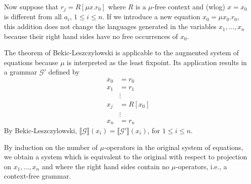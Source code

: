 \documentclass[11pt]{article}
\newcommand\Sem[1]{\llbracket#1\rrbracket}
\begin{document}
Now suppose that $r_j = R[\mu x.r_0]$ where $R$ is a $\mu$-free context and (wlog) $x=x_0$ is different from all $a_i$, $1\le i\le n$. If we introduce a new equation $x_0 = \mu x_0. r_0$, this addition does not change the languages generated in the variables $x_1, \dots, x_n$ because their right hand sides have no free occurrences of $x_0$.

The theorem of Bekic-Leszczylowski is applicable to the augmented system of equations because $\mu$ is interpreted as the least fixpoint. Its application results in a grammar $\mathcal{G}'$ defined by
\begin{align*}
  x_0 & = r_0 \\
  x_1 & = r_1 \\
      & \vdots \\
  x_j & = R[x_0] \\
      & \vdots \\
  x_n & = r_n
\end{align*}
By Bekic-Leszczylowski, $\Sem{\mathcal{G}} (x_i) = \Sem{\mathcal{G}'} (x_i)$, for $1\le i \le n$.

By induction on the number of $\mu$-operators in the original system of equations, we obtain a system which is equivalent to the original with respect to projection on $x_1, \dots, x_n$ and where the right hand sides contain no $\mu$-operators, i.e., a context-free grammar. 
\end{document}
